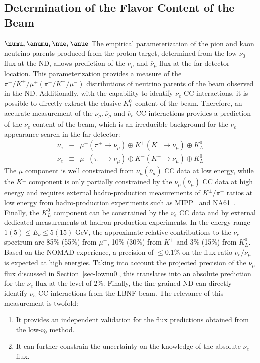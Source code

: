\subsection{Determination of the Flavor Content of the Beam} 
$\boldsymbol{\numu,\anumu, \nue, \anue}$
The empirical parameterization %
of the pion and kaon neutrino parents produced from the proton target,
determined from the low-$\nu_0$ flux at the ND, allows prediction of
the $\nu_\mu$ and $\overline{\nu}_\mu$ flux at the far detector
location.  This parameterization provides a measure of the
$\pi^+/K^+/\mu^+(\pi^-/K^-/\mu^-)$ distributions of neutrino parents
of the beam observed in the ND.  Additionally, with the capability to
identify $\overline{\nu}_e$ CC interactions, it is possible to
directly extract the elusive $K^0_L$ content of the beam.  Therefore,
an accurate measurement of the $\nu_\mu, \overline{\nu}_\mu$ and
$\overline{\nu}_e$ CC interactions provides a prediction of the
$\nu_e$ content of the beam, which is an irreducible background for
the $\nu_e$ appearance search in the far detector:
\begin{eqnarray} \label{eqn:nueparents}
\nu_e & \equiv & \mu^+(\pi^+\to \nu_\mu) \oplus K^+(K^+\to \nu_\mu) \oplus K^0_L\\
\overline{\nu}_e & \equiv & \mu^-(\pi^-\to \overline{\nu}_\mu) \oplus K^-(K^-\to \overline{\nu}_\mu) \oplus K^0_L
\end{eqnarray}
The $\mu$ component is well constrained from $\nu_\mu
(\overline{\nu}_\mu)$ CC data at low energy, while the $K^\pm$
component is only partially constrained by the $\nu_\mu
(\overline{\nu}_\mu)$ CC data at high energy and requires external
hadro-production measurements of $K^\pm/\pi^\pm$ ratios at low energy
from hadro-production experiments such as MIPP~\cite{Raja:2005sh} and
NA61~\cite{Korzenev:2013gia}.  Finally, the $K_L^0$ component can be
constrained by the $\overline{\nu}_e$ CC data and by external
dedicated measurements at hadron-production experiments.  In the
energy range $1 (5) \leq E_\nu \leq 5 (15)$ \si{GeV}, the approximate
relative contributions to the $\nu_e$ spectrum are 85\% (55\%) from
$\mu^+$, 10\% (30\%) from $K^+$ and 3\% (15\%) from $K_L^0$.
Based on the NOMAD experience, %
a precision of $\leq 0.1\%$ on the flux ratio $\nu_e/\nu_\mu$ is
expected at high energies. Taking into account the projected precision
of the $\nu_\mu$ flux discussed in Section~\ref{sec-lownu0}, this
translates into an absolute prediction for the $\nu_e$ flux at the
level of $2\%$.
Finally, the fine-grained ND can directly identify $\nu_e$ CC
interactions from the LBNF beam. The relevance of this measurement is
twofold:
\begin{enumerate}
\item It provides an independent
validation for the flux predictions obtained from the low-$\nu_0$ method.
\item It can
further constrain the uncertainty on the knowledge of the absolute $\nu_e$ flux.
\end{enumerate}
